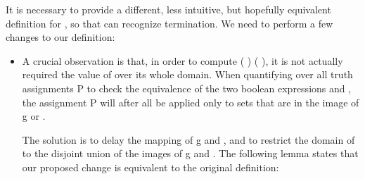 It is necessary to provide a different, less intuitive, but hopefully equivalent definition for , so that \Coq{} can recognize termination. We need to perform a few changes to our definition:

\begin{itemize}
  \item A crucial observation is that, in order to compute   (  ) (  ), it is not actually required the value of  over its whole domain. When quantifying over all truth assignments \var P to check the equivalence of the two boolean expressions    and   , the assignment \var P will after all be applied only to sets that are in the image of \var g or .
  
  The solution is to delay the mapping of \var g and , and to restrict the domain of  to the disjoint union of the images of \var g and . The following lemma states that our proposed change is equivalent to the original definition:


\end{itemize}

